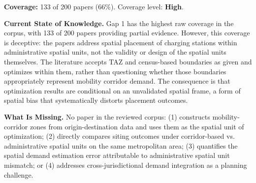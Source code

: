 \documentclass[letterpaper, 12pt, oneside, doublespacing]{Thesis}
\begin{document}
\noindent \textbf{Coverage:} 133 of 200 papers (66\%). Coverage level: \textbf{High}.



\noindent \textbf{Current State of Knowledge.} Gap 1 has the highest raw coverage in the corpus, with 133 of 200 papers providing partial evidence. However, this coverage is deceptive: the papers address spatial placement of charging stations within administrative spatial units, not the validity or design of the spatial units themselves. The literature accepts TAZ and census-based boundaries as given and optimizes within them, rather than questioning whether those boundaries appropriately represent mobility corridor demand. The consequence is that optimization results are conditional on an unvalidated spatial frame, a form of spatial bias that systematically distorts placement outcomes.



\noindent \textbf{What Is Missing.} No paper in the reviewed corpus: (1) constructs mobility-corridor zones from origin-destination data and uses them as the spatial unit of optimization; (2) directly compares siting outcomes under corridor-based vs. administrative spatial units on the same metropolitan area; (3) quantifies the spatial demand estimation error attributable to administrative spatial unit mismatch; or (4) addresses cross-jurisdictional demand integration as a planning challenge.
\end{document}
